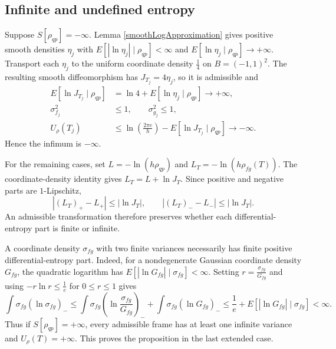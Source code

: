 \documentclass{techbrief}
\begin{document}
\subsection{Infinite and undefined entropy}

Suppose $S[\rho_{qp}]=-\infty$. Lemma \ref{smoothLogApproximation} gives positive smooth densities $\eta_j$ with $E[|\ln\eta_j|\mid\rho_{qp}]<\infty$ and $E[\ln\eta_j\mid\rho_{qp}]\to+\infty$. Transport each $\eta_j$ to the uniform coordinate density $\frac{1}{4}$ on $B=(-1,1)^2$. The resulting smooth diffeomorphism has $J_{T_j}=4\eta_j$, so it is admissible and
\begin{equation*}
	\begin{aligned}
		E[\ln J_{T_j}\mid\rho_{qp}]
		&=\ln4+E[\ln\eta_j\mid\rho_{qp}]\longrightarrow+\infty,\\
		\sigma_{f_j}^2&\leq1,\qquad \sigma_{g_j}^2\leq1,\\
		U_\rho(T_j)
		&\leq\ln\left(\frac{2\pi e}{h}\right)
		-E[\ln J_{T_j}\mid\rho_{qp}]\longrightarrow-\infty.
	\end{aligned}
\end{equation*}
Hence the infimum is $-\infty$.

For the remaining cases, set $L=-\ln(h\rho_{qp})$ and $L_T=-\ln(h\rho_{fg}(T))$. The coordinate-density identity gives $L_T=L+\ln J_T$. Since positive and negative parts are $1$-Lipschitz,
\begin{equation*}
	|(L_T)_+-L_+|\leq|\ln J_T|,
	\qquad
	|(L_T)_--L_-|\leq|\ln J_T|.
\end{equation*}
An admissible transformation therefore preserves whether each differential-entropy part is finite or infinite.

A coordinate density $\sigma_{fg}$ with two finite variances necessarily has finite positive differential-entropy part. Indeed, for a nondegenerate Gaussian coordinate density $G_{fg}$, the quadratic logarithm has $E[|\ln G_{fg}|\mid\sigma_{fg}]<\infty$. Setting $r=\frac{\sigma_{fg}}{G_{fg}}$ and using $-r\ln r\leq\frac{1}{e}$ for $0\leq r\leq1$ gives
\begin{equation*}
	\int\sigma_{fg}(\ln\sigma_{fg})_-
	\leq\int\sigma_{fg}\left(\ln\frac{\sigma_{fg}}{G_{fg}}\right)_-+\int\sigma_{fg}(\ln G_{fg})_-
	\leq\frac{1}{e}+E[|\ln G_{fg}|\mid\sigma_{fg}]<\infty.
\end{equation*}
Thus if $S[\rho_{qp}]=+\infty$, every admissible frame has at least one infinite variance and $U_\rho(T)=+\infty$. This proves the proposition in the last extended case.
\end{document}
